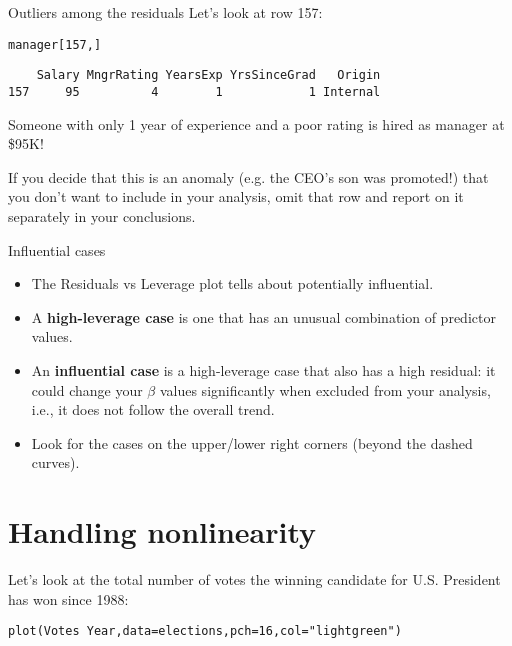 \documentclass{beamer}\usepackage[]{graphicx}\usepackage[]{color}
\makeatletter
\newcommand{\hlnum}[1]{\textcolor[rgb]{0.824,0.412,0.118}{#1}}%
\newcommand{\hlstr}[1]{\textcolor[rgb]{1,0.894,0.71}{#1}}%
\newcommand{\hlopt}[1]{\textcolor[rgb]{1,0.894,0.769}{#1}}%
\newcommand{\hlstd}[1]{\textcolor[rgb]{1,0.894,0.769}{#1}}%
\newcommand{\hlkwc}[1]{\textcolor[rgb]{0.78,0.941,0.545}{#1}}%
\newcommand{\hlkwd}[1]{\textcolor[rgb]{1,0.78,0.769}{#1}}%
\newenvironment{kframe}{%
 \def\at@end@of@kframe{}%
 \ifinner\ifhmode%
  \def\at@end@of@kframe{\end{minipage}}%
  \begin{minipage}{\columnwidth}%
 \fi\fi%
 \def\FrameCommand##1{\hskip\@totalleftmargin \hskip-\fboxsep
 \colorbox{shadecolor}{##1}\hskip-\fboxsep
     \hskip-\linewidth \hskip-\@totalleftmargin \hskip\columnwidth}%
 \MakeFramed {\advance\hsize-\width
   \@totalleftmargin\z@ \linewidth\hsize
   \@setminipage}}%
 {\par\unskip\endMakeFramed%
 \at@end@of@kframe}
\newenvironment{knitrout}{}{} %
\makeatother
\begin{document}
\begin{darkframes}
    \begin{frame}[fragile]{Outliers among the residuals}
      Let's look at row 157:
\begin{knitrout}
\begin{kframe}
\begin{alltt}
\hlstd{manager[}\hlnum{157}\hlstd{,]}
\end{alltt}
\begin{verbatim}
    Salary MngrRating YearsExp YrsSinceGrad   Origin
157     95          4        1            1 Internal
\end{verbatim}
\end{kframe}
\end{knitrout}
      Someone with only 1 year of experience and a poor rating is hired as manager at \$95K! \pause \bigskip

      If you decide that this is an anomaly (e.g. the CEO's son was promoted!) that you don't want to include in your analysis, omit that row and report on it separately in your conclusions.
    \end{frame}

    \begin{frame}[fragile]{Influential cases}
      \begin{itemize}[<+->]
        \item The Residuals vs Leverage plot tells about \alert{potentially influential}.
        \item A \textbf{high-leverage case} is one that has an unusual combination of predictor values.
        \item An \textbf{influential case} is a high-leverage case that also has a high residual: it could change your $\beta$ values significantly when excluded from your analysis, i.e., it does not follow the overall trend.
        \item Look for the cases on the upper/lower right corners (beyond the dashed curves).
      \end{itemize}
    \end{frame}

    \section{Handling nonlinearity}

    \begin{frame}[fragile]
      Let's look at the total number of votes the winning candidate for U.S. President has won since 1988:
\begin{knitrout}
\begin{kframe}
\begin{alltt}
\hlkwd{plot}\hlstd{(Votes} \hlopt{~} \hlstd{Year,} \hlkwc{data}\hlstd{=elections,} \hlkwc{pch}\hlstd{=}\hlnum{16}\hlstd{,} \hlkwc{col}\hlstd{=}\hlstr{"lightgreen"}\hlstd{)}
\end{alltt}
\end{kframe}



\end{knitrout}
\end{frame}
\end{darkframes}
\end{document}
